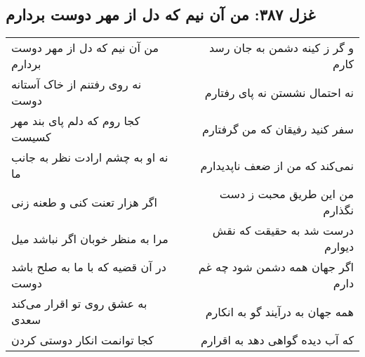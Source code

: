 \begin{center}
\section*{غزل ۳۸۷: من آن نیم که دل از مهر دوست بردارم}
\label{sec:387}
\begin{longtable}{l p{0.5cm} r}
من آن نیم که دل از مهر دوست بردارم
&&
و گر ز کینه دشمن به جان رسد کارم
\\
نه روی رفتنم از خاک آستانه دوست
&&
نه احتمال نشستن نه پای رفتارم
\\
کجا روم که دلم پای بند مهر کسیست
&&
سفر کنید رفیقان که من گرفتارم
\\
نه او به چشم ارادت نظر به جانب ما
&&
نمی‌کند که من از ضعف ناپدیدارم
\\
اگر هزار تعنت کنی و طعنه زنی
&&
من این طریق محبت ز دست نگذارم
\\
مرا به منظر خوبان اگر نباشد میل
&&
درست شد به حقیقت که نقش دیوارم
\\
در آن قضیه که با ما به صلح باشد دوست
&&
اگر جهان همه دشمن شود چه غم دارم
\\
به عشق روی تو اقرار می‌کند سعدی
&&
همه جهان به درآیند گو به انکارم
\\
کجا توانمت انکار دوستی کردن
&&
که آب دیده گواهی دهد به اقرارم
\\
\end{longtable}
\end{center}
